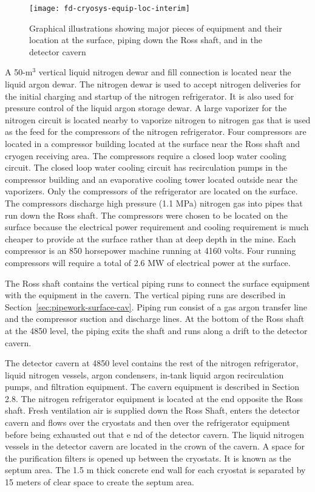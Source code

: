 \begin{figure}[htbp]
\centering
\texttt{[image: fd-cryosys-equip-loc-interim]} 
\caption{Graphical illustrations showing major pieces of equipment and their location at the
surface, piping down the Ross shaft, and in the detector cavern}
\label{fig:eqp-at-surface}
\end{figure}


A 50-m$^3$ vertical liquid nitrogen dewar
and fill connection is located near the liquid argon dewar.
The nitrogen dewar is used to accept nitrogen deliveries for the initial charging and startup of
the nitrogen refrigerator. It is also used for pressure control of the liquid argon storage dewar.
A large vaporizer for the nitrogen circuit is located nearby to vaporize nitrogen to nitrogen gas
that is used as the feed for the compressors of the nitrogen refrigerator. Four compressors are
located in a compressor building located at the surface near the Ross shaft and cryogen
receiving area. The compressors require a closed loop water cooling circuit. The closed loop
water cooling circuit has recirculation pumps in the compressor building and an evaporative
cooling tower located outside near the
vaporizers. Only the compressors of the refrigerator are
located on the surface. The compressors discharge high pressure (1.1 MPa) nitrogen gas into
pipes that run down the Ross shaft. The compressors were chosen to be located on the surface
because the electrical power requirement and cooling requirement is much cheaper to provide
at the surface rather than at deep depth in the mine. Each compressor
is an 850 horsepower
machine running at 4160 volts. Four running compressors will require a total of
2.6 MW of electrical power at the surface.

The Ross shaft contains the vertical piping runs to connect the surface equipment with the
equipment in the cavern. The vertical piping runs are described
in Section~\ref{sec:pipework-surface-cav}. 
Piping run consist of a
gas argon transfer line and the compressor suction and discharge lines. At the
bottom of the Ross shaft at the 4850 level, the piping exits the shaft and runs along a drift to
the detector cavern.

The detector cavern at 4850 level
contains the rest of the nitrogen refrigerator, liquid nitrogen
vessels, argon condensers, in-tank liquid argon recirculation pumps, and filtration equipment.
The cavern equipment is described in Section 2.8. The nitrogen
refrigerator equipment is
located at the end opposite the Ross shaft. Fresh ventilation air is supplied down the Ross
Shaft, enters the detector cavern and flows over the cryostats and then over the refrigerator
equipment before being exhausted out that e
nd of the detector cavern. The liquid nitrogen
vessels in the detector cavern are located in the crown of the cavern. A space for the
purification filters is opened up between the cryostats. It is known as the septum area. The 1.5
m thick concrete end
wall for each cryostat is separated by 15 meters of clear space to create
the septum area.

